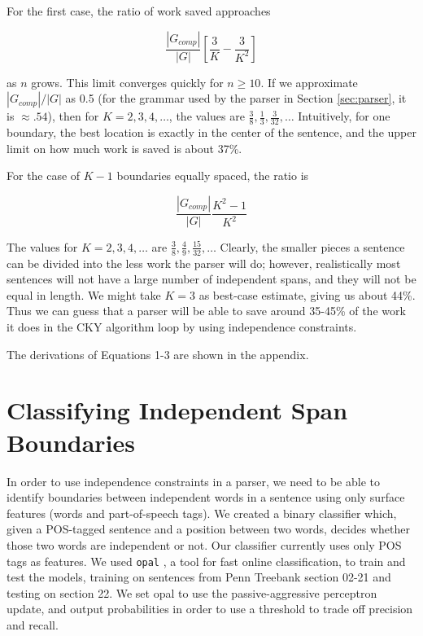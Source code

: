 \documentclass[11pt]{article}
\begin{document}
For the first case, the ratio of work saved approaches

\begin{equation}
\frac{|G_{comp}|}{|G|} \left[ \frac{3}{K} - \frac{3}{K^2} \right]
\end{equation}

as $n$ grows. This limit converges quickly for $n \ge 10$. If we
approximate $|G_{comp}|/|G|$ as 0.5 (for the grammar used by the parser in
Section \ref{sec:parser}, it is $\approx .54$), then for
$K=2,3,4,\dots$, the values are $\frac{3}{8}, \frac{1}{3}, \frac{3}{32}, \dots$
Intuitively, for one boundary, the best location
is exactly in the center of the sentence, and the upper limit on how
much work is saved is about 37\%.

For the case of $K-1$ boundaries equally spaced, the ratio is

\begin{equation}
\frac{|G_{comp}|}{|G|}\frac{K^2 - 1}{K^2}
\end{equation}

The values for $K=2,3,4,\dots$ are $\frac{3}{8}, \frac{4}{9}, \frac{15}{32}, \dots$
Clearly, the smaller pieces a sentence can be
divided into the less work the parser will do; however, realistically
most sentences will not have a large number of independent spans, and
they will not be equal in length. We might take $K=3$ as best-case
estimate, giving us about 44\%. Thus we can guess that a parser will be
able to save around 35-45\% of the work it does in the CKY algorithm
loop by using independence constraints.

The derivations of Equations 1-3 are shown in the appendix.

\section{Classifying Independent Span Boundaries}
\label{sec-4}

In order to use independence constraints in a parser, we need to be
able to identify boundaries between independent words in a sentence
using only surface features (words and part-of-speech tags). We
created a binary classifier which, given a POS-tagged sentence and a
position between two words, decides whether those two words are
independent or not. Our classifier currently uses only POS tags as
features. We used \texttt{opal} \cite{Yoshinaga2010}, a tool for fast online
classification, to train and test the models, training on sentences
from Penn Treebank section 02-21 and testing on section 22. We set
opal to use the passive-aggressive perceptron update, and output
probabilities in order to use a threshold to trade off precision and
recall.
\end{document}
